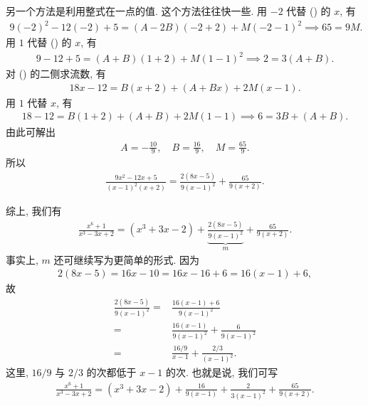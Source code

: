 \begin{example}
    另一个方法是利用整式在一点的值. 这个方法往往快一些. 用 $-2$ 代替 (\myStar) 的 $x$, 有
    \begin{align*}
        9(-2)^2 - 12(-2) + 5 = (A - 2B) (-2 + 2) + M (-2-1)^2 \implies 65 = 9M.
    \end{align*}
    用 $1$ 代替 (\myStar) 的 $x$, 有
    \begin{align*}
        9 - 12 + 5 = (A + B) (1 + 2) + M (1 - 1)^2 \implies 2 = 3 (A + B).
    \end{align*}
    对 (\myStar) 的二侧求流数, 有
    \begin{align*}
        18x - 12 = B (x + 2) + (A + Bx) + 2M (x - 1).
    \end{align*}
    用 $1$ 代替 $x$, 有
    \begin{align*}
        18 - 12 = B (1 + 2) + (A + B) + 2M (1 - 1) \implies 6 = 3B + (A + B).
    \end{align*}
    由此可解出
    \begin{align*}
        A = -\frac{10}{9}, \quad B = \frac{16}{9}, \quad M = \frac{65}{9}.
    \end{align*}
    所以
    \begin{align*}
        \frac{9x^2 - 12x + 5}{(x - 1)^2 (x + 2)} = \frac{2(8x - 5)}{9(x - 1)^2} + \frac{65}{9(x + 2)}.
    \end{align*}

    综上, 我们有
    \begin{align*}
        \frac{x^6 + 1}{x^3 - 3x + 2} = (x^3 + 3x - 2) + {\underbrace{\frac{2(8x - 5)}{9(x - 1)^2}}_{m}} + \frac{65}{9(x + 2)}.
    \end{align*}
    事实上, $m$ 还可继续写为更简单的形式. 因为
    \begin{align*}
        2(8x - 5) = 16x - 10 = 16x - 16 + 6 = 16(x - 1) + 6,
    \end{align*}
    故
    \begin{align*}
        \frac{2(8x - 5)}{9(x - 1)^2}
        = {} & \frac{16(x - 1) + 6}{9(x - 1)^2}                    \\
        = {} & \frac{16(x - 1)}{9(x - 1)^2} + \frac{6}{9(x - 1)^2} \\
        = {} & \frac{16/9}{x - 1} + \frac{2/3}{(x - 1)^2}.
    \end{align*}
    这里, $16/9$ 与 $2/3$ 的次都低于 $x-1$ 的次. 也就是说, 我们可写
    \begin{align*}
        \frac{x^6 + 1}{x^3 - 3x + 2} = (x^3 + 3x - 2) + \frac{16}{9(x - 1)} + \frac{2}{3(x - 1)^2} + \frac{65}{9(x + 2)}.
    \end{align*}
\end{example}

